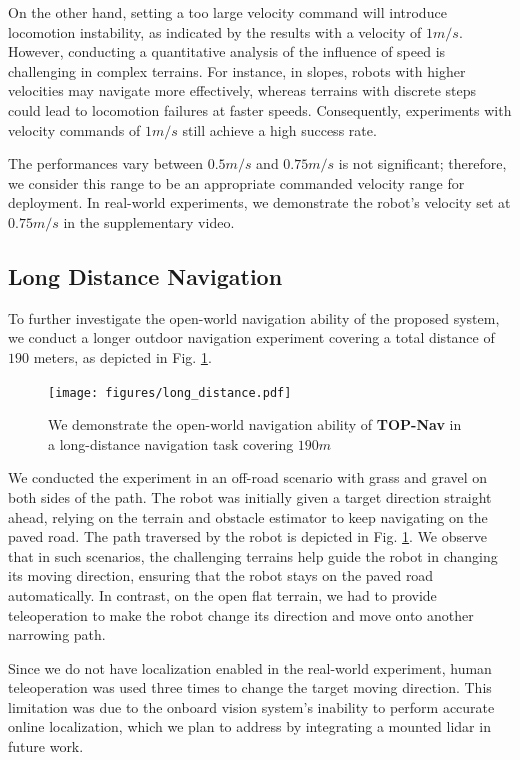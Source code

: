 \documentclass[conference]{IEEEtran}
\begin{document}
On the other hand, setting a too large velocity command will introduce locomotion instability, as indicated by the results with a velocity of $1m/s$. However, conducting a quantitative analysis of the influence of speed is challenging in complex terrains. For instance, in slopes, robots with higher velocities may navigate more effectively, whereas terrains with discrete steps could lead to locomotion failures at faster speeds. Consequently, experiments with velocity commands of $1m/s$ still achieve a high success rate.

The performances vary between $0.5m/s$ and $0.75m/s$ is not significant; therefore, we consider this range to be an appropriate commanded velocity range for deployment. In real-world experiments, we demonstrate the robot's velocity set at $0.75m/s$ in the supplementary video.

\subsection{Long Distance Navigation}
To further investigate the open-world navigation ability of the proposed system, we conduct a longer outdoor navigation experiment covering a total distance of $190$ meters, as depicted in Fig. \ref{long-distance}.

\begin{figure}[htbp]
\centerline{\texttt{[image: figures/long\_distance.pdf]}}
\caption{We demonstrate the open-world navigation ability of \textbf{TOP-Nav} in a long-distance navigation task covering $190m$}
\label{long-distance}
\end{figure}

We conducted the experiment in an off-road scenario with grass and gravel on both sides of the path. The robot was initially given a target direction straight ahead, relying on the terrain and obstacle estimator to keep navigating on the paved road. The path traversed by the robot is depicted in Fig. \ref{long-distance}. We observe that in such scenarios, the challenging terrains help guide the robot in changing its moving direction, ensuring that the robot stays on the paved road automatically. In contrast, on the open flat terrain, we had to provide teleoperation to make the robot change its direction and move onto another narrowing path.

Since we do not have localization enabled in the real-world experiment, human teleoperation was used three times to change the target moving direction. This limitation was due to the onboard vision system's inability to perform accurate online localization, which we plan to address by integrating a mounted lidar in future work.
\end{document}
